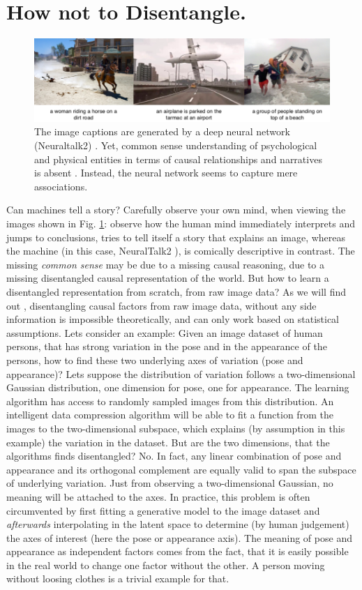 \section{How not to Disentangle.}
	\begin{figure}[t]
		\centering
		\includegraphics[trim={0cm 0cm 0cm 0cm},clip, width=1.\linewidth]{fig/other/notcausal}
		\caption{The image captions are generated by a deep neural network (Neuraltalk2) \cite{karpathy15neuraltalk}. Yet, common sense understanding of psychological and physical entities in terms of causal relationships and narratives is absent \cite{tenenbaum18think}. Instead, the neural network seems to capture mere associations.}
		\label{fig:notcausal}
	\end{figure}
	Can machines tell a story? Carefully observe your own mind, when viewing the images shown in Fig. \ref{fig:notcausal}: observe how the human mind immediately interprets and jumps to conclusions, tries to tell itself a story that explains an image, whereas the machine (in this case, NeuralTalk2 \cite{karpathy15neuraltalk}), is comically descriptive in contrast.
	The missing \textit{common sense} may be due to a missing causal reasoning, due to a missing disentangled causal representation of the world.
	But how to learn a disentangled representation from scratch, \ie from raw image data?
	As we will find out , disentangling causal factors from raw image data, without any side information is impossible theoretically, and can only work based on statistical assumptions.
	Lets consider an example:
	Given an image dataset of human persons, that has strong variation in the pose and in the appearance of the persons, how to find these two underlying axes of variation (pose and appearance)? Lets suppose the distribution of variation follows a two-dimensional Gaussian distribution, one dimension for pose, one for appearance. The learning algorithm has access to randomly sampled images from this distribution. An intelligent data compression algorithm will be able to fit a function from the images to the two-dimensional subspace, which explains (by assumption in this example) the variation in the dataset.
	But are the two dimensions, that the algorithms finds disentangled? No. In fact, any linear combination of pose and appearance and its orthogonal complement are equally valid to span the subspace of underlying variation. Just from observing a two-dimensional Gaussian, no meaning will be attached to the axes. In practice, this problem is often circumvented by first fitting a generative model to the image dataset and \textit{afterwards} interpolating in the latent space to determine (by human judgement) the axes of interest (here the pose or appearance axis). The meaning of pose and appearance as independent factors comes from the fact, that it is easily possible in the real world to change one factor without the other. A person moving without loosing clothes is a trivial example for that.
